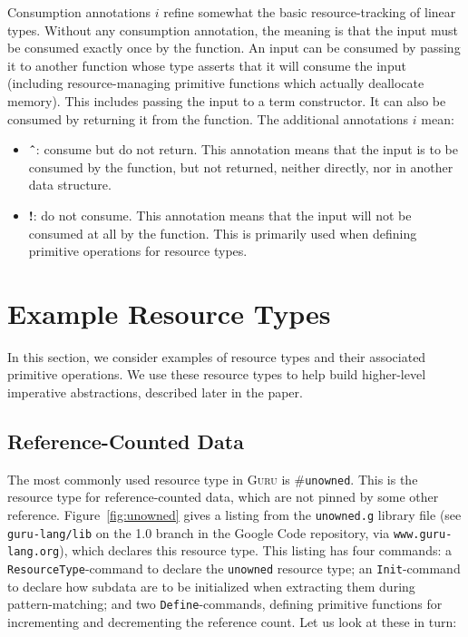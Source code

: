 \documentclass[9pt,natbib]{sigplanconf}
\begin{document}
Consumption annotations $i$ refine somewhat the basic
resource-tracking of linear types.  Without any consumption
annotation, the meaning is that the input must be consumed exactly
once by the function.  An input can be consumed by passing it to
another function whose type asserts that it will consume the input
(including resource-managing primitive functions which actually
deallocate memory).  This includes passing the input to a term
constructor.  It can also be consumed by returning it from the
function.  The additional annotations $i$ mean:

\begin{itemize}

\item \textbf{\^{\ }}: consume but do not return.  This annotation
  means that the input is to be consumed by the function, but not
  returned, neither directly, nor in another data structure.

\item \textbf{!}: do not consume.  This annotation means that the
  input will not be consumed at all by the function.  This is
  primarily used when defining primitive operations for resource
  types.

\end{itemize}

\section{Example Resource Types}

In this section, we consider examples of resource types and their
associated primitive operations.  We use these resource types to
help build higher-level imperative abstractions, described later
in the paper.

\subsection{Reference-Counted Data}
\label{sec:unowned}

The most commonly used resource type in \textsc{Guru} is
\#\texttt{unowned}.  This is the resource type for reference-counted
data, which are not pinned by some other reference.
Figure~\ref{fig:unowned} gives a listing from the \texttt{unowned.g}
library file (see \texttt{guru-lang/lib} on the 1.0 branch in the
Google Code repository, via \texttt{www.guru-lang.org}), which
declares this resource type.  This listing has four commands: a
\texttt{ResourceType}-command to declare the \texttt{unowned} resource
type; an \texttt{Init}-command to declare how subdata are to be
initialized when extracting them during pattern-matching; and two
\texttt{Define}-commands, defining primitive functions for
incrementing and decrementing the reference count.  Let us look at
these in turn:
\end{document}
